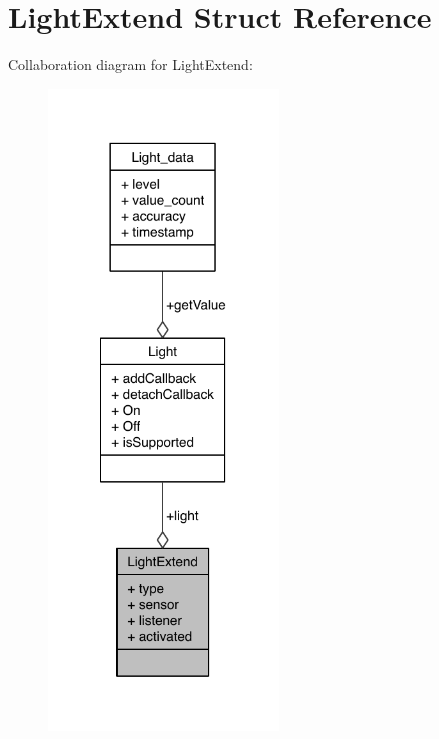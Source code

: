 \section{Light\-Extend Struct Reference}
\label{structLightExtend}


Collaboration diagram for Light\-Extend\-:
\nopagebreak
\begin{figure}[H]
\begin{center}
\leavevmode
\includegraphics[width=173pt]{structLightExtend__coll__graph}
\end{center}
\end{figure}
